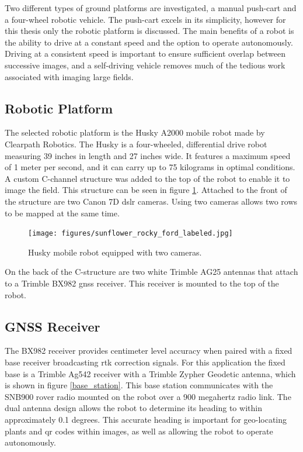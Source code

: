 Two different types of ground platforms are investigated, a manual push-cart and a four-wheel robotic vehicle.  The push-cart excels in its simplicity, however for this thesis only the robotic platform is discussed.  The main benefits of a robot is the ability to drive at a constant speed and the option to operate autonomously.  Driving at a consistent speed is important to ensure sufficient overlap between successive images, and a self-driving vehicle removes much of the tedious work associated with imaging large fields.  

\subsection{Robotic Platform}

The selected robotic platform is the Husky A2000 mobile robot made by Clearpath Robotics.  The Husky is a four-wheeled, differential drive robot measuring 39 inches in length and 27 inches wide.  It features a maximum speed of 1 meter per second, and it can carry up to 75 kilograms in optimal conditions.  A custom C-channel structure was added to the top of the robot to enable it to image the field.  This structure can be seen in figure \ref{husky_rocky_ford}.  Attached to the front of the structure are two Canon 7D \ac{dslr} cameras.  Using two cameras allows two rows to be mapped at the same time. 

\begin{figure}
	\centering
    \texttt{[image: figures/sunflower\_rocky\_ford\_labeled.jpg]}
    \caption[Husky robot]{Husky mobile robot equipped with two cameras.}
    \label{husky_rocky_ford}
\end{figure}

On the back of the C-structure are two white Trimble AG25 antennas that attach to a Trimble BX982 \ac{gnss} receiver.  This receiver is mounted to the top of the robot.

\subsection{GNSS Receiver}

The BX982 receiver provides centimeter level accuracy when paired with a fixed base receiver broadcasting \ac{rtk} correction signals.  For this application the fixed base is a Trimble Ag542 receiver with a Trimble Zypher Geodetic antenna, which is shown in figure \ref{base_station}.  This base station communicates with the SNB900 rover radio mounted on the robot over a 900 megahertz radio link.   The dual antenna design allows the robot to determine its heading to within approximately 0.1 degrees.  This accurate heading is important for geo-locating plants and \ac{qr} codes within images, as well as allowing the robot to operate autonomously. 

